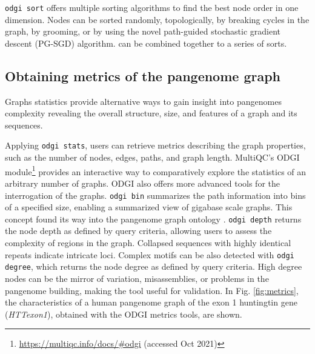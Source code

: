 \documentclass{bioinfo}
\begin{document}
\texttt{odgi sort} offers multiple sorting algorithms to find the best node order in one dimension. Nodes can be sorted randomly, topologically, by breaking cycles in the graph, by grooming, or by using the novel path-guided stochastic gradient descent (PG-SGD) algorithm.  can be combined together to a series of sorts.

\subsection{Obtaining metrics of the pangenome graph}





Graphs statistics provide alternative ways to gain insight into pangenomes complexity revealing the overall structure, size, and features of a graph and its sequences. 

Applying \texttt{odgi stats}, users can retrieve metrics describing the graph properties, such as the number of nodes, edges, paths, and graph length. MultiQC's \citep{Ewels_2016} ODGI module\footnote{\url{https://multiqc.info/docs/\#odgi} (accessed Oct 2021)} provides an interactive way to comparatively explore the statistics of an arbitrary number of graphs. ODGI also offers more advanced tools for the interrogation of the graphs. \texttt{odgi bin} summarizes the path information into bins of a specified size, enabling a summarized view of gigabase scale graphs. This concept found its way into the pangenome graph ontology \cite{Yokoyama2020}. \texttt{odgi depth} returns the node depth as defined by query criteria, allowing users to assess the complexity of regions in the graph. Collapsed sequences with highly identical repeats indicate intricate loci. Complex motifs can be also detected with \texttt{odgi degree}, which returns the node degree as defined by query criteria. High degree nodes can be the mirror of variation, misassemblies, or problems in the pangenome building, making the tool useful for validation. In Fig. \ref{fig:metrics}, the characteristics of a human pangenome graph of the exon 1 huntingtin gene \citep{Sathasivam2013,Neueder2017} (\textit{HTTexon1}), obtained with the ODGI metrics tools, are shown.


\end{document}
